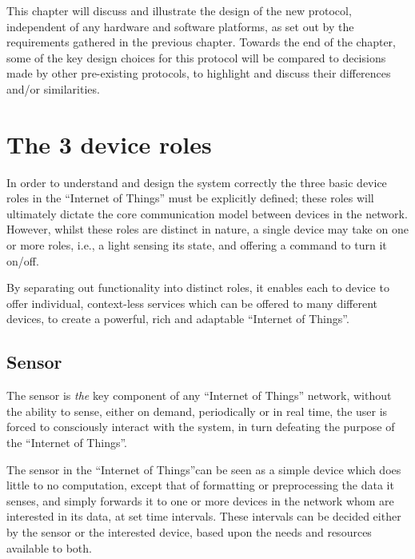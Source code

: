 \newlength{\maxheight}

\newcommand{\baselinealign}[1]{%
	\centering
	\raisebox{0pt}[\maxheight][0pt]{#1}%
}


This chapter will discuss and illustrate the design of the new protocol, independent of any hardware and software platforms, as set out by the requirements gathered in the previous chapter. Towards the end of the chapter, some of the key design choices for this protocol will be compared to decisions made by other pre-existing protocols, to highlight and discuss their differences and/or similarities.

\section{The 3 device roles} %
\label{sec:the_3_classifications_of_devices}
In order to understand and design the system correctly the three basic device roles in the ``Internet of Things'' must be explicitly defined; these roles will ultimately dictate the core communication model between devices in the network. However, whilst these roles are distinct in nature, a single device may take on one or more roles, i.e., a light sensing its state, and offering a command to turn it on/off.

By separating out functionality into distinct roles, it enables each to device to offer individual, context-less services which can be offered to many different devices, to create a powerful, rich and adaptable ``Internet of Things''.

\subsection{Sensor} %
\label{sub:sensor}
The sensor is \textit{the} key component of any ``Internet of Things'' network, without the ability to sense, either on demand, periodically or in real time, the user is forced to consciously interact with the system, in turn defeating the purpose of the ``Internet of Things''.

The sensor in the ``Internet of Things''can be seen as a simple device which does little to no computation, except that of formatting or preprocessing the data it senses, and simply forwards it to one or more devices in the network whom are interested in its data, at set time intervals. These intervals can be decided either by the sensor or the interested device, based upon the needs and resources available to both.


